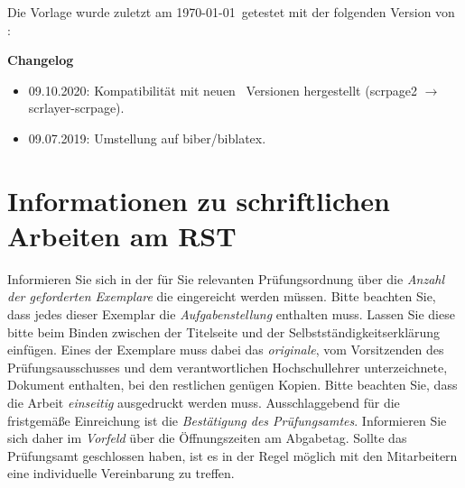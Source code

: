 Die Vorlage wurde zuletzt am \today~getestet mit der folgenden Version von \KOMAScript: \KOMAScriptVersion 

\textbf{Changelog}
\begin{itemize}
	\item 09.10.2020: Kompatibilität mit neuen \KOMAScript~Versionen hergestellt (scrpage2 $\rightarrow$ scrlayer-scrpage).
	\item 09.07.2019: Umstellung auf biber/biblatex.
\end{itemize}

\section{Informationen zu schriftlichen Arbeiten am RST}
Informieren Sie sich in der für Sie relevanten Prüfungsordnung über die \emph{Anzahl der geforderten Exemplare} die eingereicht werden müssen. Bitte beachten Sie, dass jedes dieser Exemplar die \emph{Aufgabenstellung} enthalten muss. Lassen Sie diese bitte beim Binden zwischen der Titelseite und der Selbstständigkeitserklärung einfügen. Eines der Exemplare muss dabei das \emph{originale}, vom Vorsitzenden des Prüfungsausschusses und dem verantwortlichen Hochschullehrer unterzeichnete, Dokument enthalten, bei den restlichen genügen Kopien. Bitte beachten Sie, dass die Arbeit \emph{einseitig} ausgedruckt werden muss. Ausschlaggebend für die fristgemäße Einreichung ist die \emph{Bestätigung des Prüfungsamtes}. Informieren Sie sich daher im \emph{Vorfeld} über die Öffnungszeiten am Abgabetag. Sollte das Prüfungsamt geschlossen haben, ist es in der Regel möglich mit den Mitarbeitern eine individuelle Vereinbarung zu treffen.


